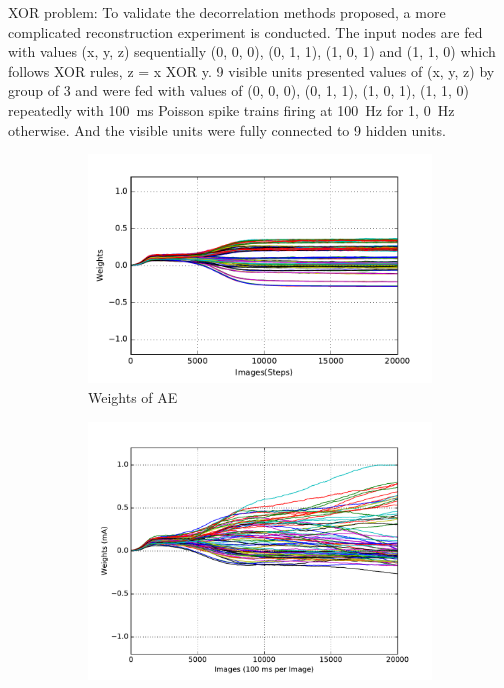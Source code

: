 XOR problem:
To validate the decorrelation methods proposed, a more complicated reconstruction experiment is conducted.
The input nodes are fed with values (x, y, z) sequentially (0, 0, 0), (0, 1, 1), (1, 0, 1) and (1, 1, 0) which follows XOR rules, z = x XOR y.
9 visible units presented values of (x, y, z) by group of 3 and were fed with values of (0, 0, 0), (0, 1, 1), (1, 0, 1), (1, 1, 0) repeatedly with 100~ms Poisson spike trains firing at 100~Hz for 1, 0~Hz otherwise. And the visible units were fully connected to 9 hidden units.
\begin{figure}
	\centering
	\begin{subfigure}[t]{0.32\textwidth}
		\includegraphics[width=\textwidth]{pics_sdlm/21_exp_AE_noise/exp3_weights_s.pdf}
		\caption{Weights of AE}
	\end{subfigure}
	\begin{subfigure}[t]{0.32\textwidth}
		\includegraphics[width=\textwidth]{pics_sdlm/00_exp_SAE_Orig/exp3_weights_s.pdf}

\end{subfigure}
\end{figure}
